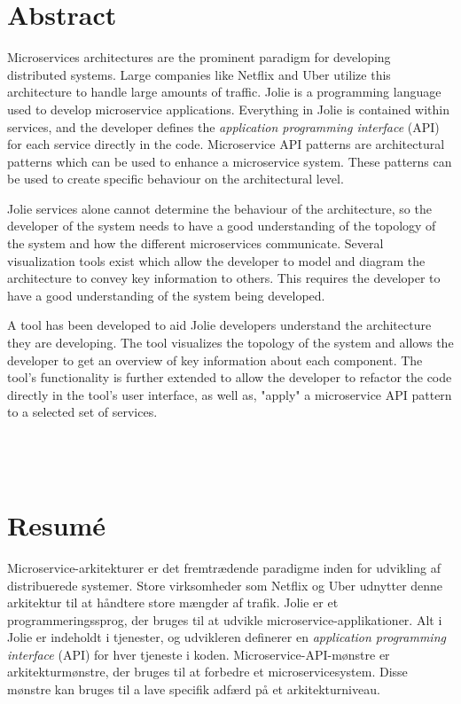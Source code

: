 \section*{\centering Abstract}
Microservices architectures are the prominent paradigm for developing distributed systems.
Large companies like Netflix and Uber utilize this architecture to handle large amounts of traffic.
Jolie is a programming language used to develop microservice applications.
Everything in Jolie is contained within services, and the developer defines the \emph{application programming interface} (API) for each service directly in the code.
Microservice API patterns are architectural patterns which can be used to enhance a microservice system.
These patterns can be used to create specific behaviour on the architectural level.

Jolie services alone cannot determine the behaviour of the architecture, so the developer of the system needs to have a good understanding of the topology of the system and how the different microservices communicate.
Several visualization tools exist which allow the developer to model and diagram the architecture to convey key information to others.
This requires the developer to have a good understanding of the system being developed.

A tool has been developed to aid Jolie developers understand the architecture they are developing. The tool visualizes the topology of the system and allows the developer to 
get an overview of key information about each component. The tool's functionality is further extended to allow the developer to refactor the code directly in the tool's user interface, as well as, "apply" a microservice API pattern to a selected set of services.
\\
\\
\\
\\
\section*{\centering Resumé}
Microservice-arkitekturer er det fremtrædende paradigme inden for udvikling af distribuerede systemer.
Store virksomheder som Netflix og Uber udnytter denne arkitektur til at håndtere store mængder af trafik.
Jolie er et programmeringssprog, der bruges til at udvikle microservice-applikationer.
Alt i Jolie er indeholdt i tjenester, og udvikleren definerer en \emph{application programming interface} (API) for hver tjeneste i koden.
Microservice-API-mønstre er arkitekturmønstre, der bruges til at forbedre et microservicesystem.
Disse mønstre kan bruges til a lave specifik adfærd på et arkitekturniveau.

